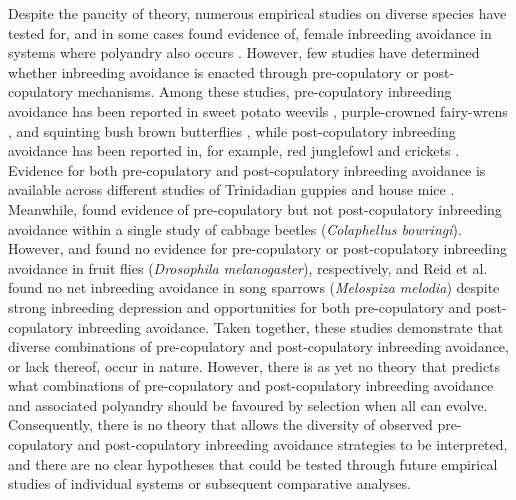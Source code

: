 \documentclass[10pt,letterpaper]{article}
\begin{document}
Despite the paucity of theory, numerous empirical studies on diverse species have tested for, and in some cases found evidence of, female inbreeding avoidance in systems where polyandry also occurs \cite[][but see \citealt{Reid2015a}]{Tregenza2002, Varian-Ramos2012, Kingma2013, Arct2015}. However, few studies have determined whether inbreeding avoidance is enacted through pre-copulatory or post-copulatory mechanisms. Among these studies, pre-copulatory inbreeding avoidance has been reported in sweet potato weevils \cite[\textit{Cylas formicarius};][]{Kuriwada2011}, purple-crowned fairy-wrens \cite[\textit{Malurus coronatus};][]{Kuriwada2011}, and squinting bush brown butterflies \cite[\textit{Bicyclus anynana};][]{Fischer2015}, while post-copulatory inbreeding avoidance has been reported in, for example, red junglefowl \cite[\textit{Gallus gallus};][]{Pizzari2004} and crickets \cite[\textit{Teleogryllus oceanicus}, \textit{Gryllus bimaculatus};][]{Simmons2006, Bretman2009}. Evidence for both pre-copulatory and post-copulatory inbreeding avoidance is available across different studies of Trinidadian guppies \cite[\textit{Poecilia reticulata};][]{Gasparini2011, Daniel2015} and house mice \cite[\textit{Mus domesticus};][]{Potts1991, Firman2015}. Meanwhile, \cite{Liu2014} found evidence of pre-copulatory but not post-copulatory inbreeding avoidance within a single study of cabbage beetles (\textit{Colaphellus bowringi}). However, \cite{Ala-Honkola2011} and \cite{Tan2012} found no evidence for pre-copulatory or post-copulatory inbreeding avoidance in fruit flies (\textit{Drosophila melanogaster}), respectively, and Reid et al. \citeyearpar{Reid2014, Reid2015} found no net inbreeding avoidance in song sparrows (\textit{Melospiza melodia}) despite strong inbreeding depression and opportunities for both pre-copulatory and post-copulatory inbreeding avoidance. Taken together, these studies demonstrate that diverse combinations of pre-copulatory and post-copulatory inbreeding avoidance, or lack thereof, occur in nature. However, there is as yet no theory that predicts what combinations of pre-copulatory and post-copulatory inbreeding avoidance and associated polyandry should be favoured by selection when all can evolve. Consequently, there is no theory that allows the diversity of observed pre-copulatory and post-copulatory inbreeding avoidance strategies to be interpreted, and there are no clear hypotheses that could be tested through future empirical studies of individual systems or subsequent comparative analyses.
\end{document}
